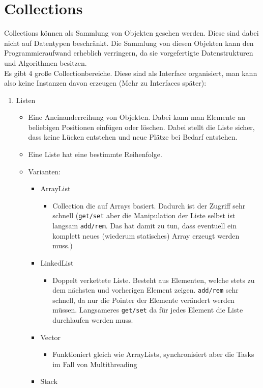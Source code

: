 \documentclass{article}
\begin{document}
	\section{Collections}
	Collections können als Sammlung von Objekten gesehen werden. Diese sind dabei nicht auf Datentypen beschränkt. Die Sammlung von diesen Objekten kann den Programmieraufwand erheblich verringern, da sie vorgefertigte Datenstrukturen und Algorithmen besitzen. \\
	Es gibt 4 große Collectionbereiche. Diese sind als Interface organisiert, man kann also keine Instanzen davon erzeugen (Mehr zu Interfaces später):
	\begin{enumerate}
		\item{Listen}
		\begin{itemize}
			\item{Eine Aneinanderreihung von Objekten. Dabei kann man Elemente an beliebigen Positionen einfügen oder löschen. Dabei stellt die Liste sicher, dass keine Lücken entstehen und neue Plätze bei Bedarf entstehen.}
			\item{Eine Liste hat eine bestimmte Reihenfolge.}
			\item{Varianten:}
			\begin{itemize}
				\item{ArrayList}
				\begin{itemize}
					\item{Collection die auf Arrays basiert. Dadurch ist der Zugriff sehr schnell (\verb|get/set| aber die Manipulation der Liste selbst ist langsam \verb|add/rem|. Das hat damit zu tun, dass eventuell ein komplett neues (wiederum statisches) Array erzeugt werden muss.)}
				\end{itemize}
				\item{LinkedList}
				\begin{itemize}
					\item{Doppelt verkettete Liste. Besteht aus Elementen, welche stets zu dem nächsten und vorherigen Element zeigen. \verb|add/rem| sehr schnell, da nur die Pointer der Elemente verändert werden müssen. Langsameres \verb|get/set| da für jedes Element die Liste durchlaufen werden muss.}
				\end{itemize}
				\item{Vector}
				\begin{itemize}
					\item{Funktioniert gleich wie ArrayLists, synchronisiert aber die Tasks im Fall von Multithreading}
				\end{itemize}
				\item{Stack}

\end{itemize}
\end{itemize}
\end{enumerate}
\end{document}

